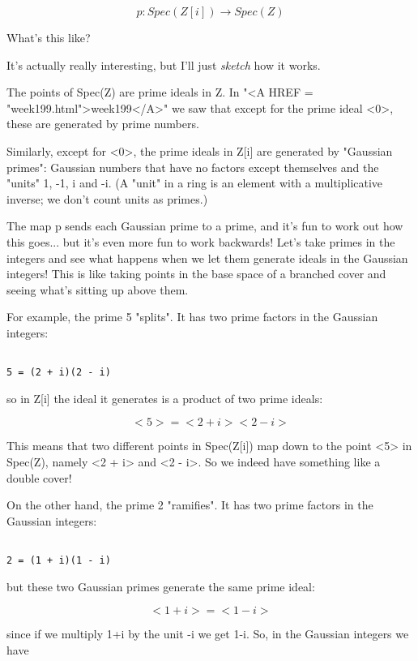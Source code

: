 $$

p: Spec(Z[i]) \to  Spec(Z)
$$
    

What's this like?  

It's actually really interesting, but I'll just \emph{sketch} how it works.

The points of Spec(Z) are prime ideals in Z.  In "<A HREF = "week199.html">week199</A>" we saw 
that except for the prime ideal <0>, these are generated by prime 
numbers.
  
Similarly, except for <0>, the prime ideals in Z[i] are generated by 
"Gaussian primes": Gaussian numbers that have no factors except 
themselves and the "units" 1, -1, i and -i.  (A "unit" 
in a ring is an 
element with a multiplicative inverse; we don't count units as primes.)

The map p sends each Gaussian prime to a prime, and it's fun to work
out how this goes... but it's even more fun to work backwards!  Let's
take primes in the integers and see what happens when we let them 
generate ideals in the Gaussian integers!  This is like taking points 
in the base space of a branched cover and seeing what's sitting up  
above them.    

For example, the prime 5 "splits".  It has two prime factors in the
Gaussian integers:


\begin{verbatim}

5 = (2 + i)(2 - i)
\end{verbatim}
    
so in Z[i] the ideal it generates is a product of two prime ideals:


$$

<5> = <2 + i> <2 - i>
$$
    

This means that two different points in Spec(Z[i]) map down to the
point <5> in Spec(Z), namely <2 + i> and <2 - i>.  
So we indeed have
something like a double cover!

On the other hand, the prime 2 "ramifies".  It has two prime 
factors in the Gaussian integers:


\begin{verbatim}

2 = (1 + i)(1 - i)
\end{verbatim}
    
but these two Gaussian primes generate the same prime ideal:


$$

<1 + i> = <1 - i>
$$
    

since if we multiply 1+i by the unit -i we get 1-i.  So, in the 
Gaussian integers we have


